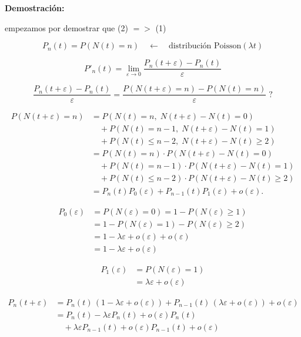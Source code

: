 \documentclass[12pt,a4paper]{article}
\begin{document}
\textbf{Demostración:}

empezamos por demostrar que (2) $= >$ (1)

\begin{equation*}
P_n(t) = P(N(t) = n) \quad \longleftarrow \quad \text{distribución Poisson}(\lambda t)
\end{equation*}

\begin{equation*}
P'_n(t) = \lim_{\varepsilon \to 0} \frac{P_n(t+\varepsilon) - P_n(t)}{\varepsilon}
\end{equation*}

\begin{equation*}
\frac{P_n(t+\varepsilon) - P_n(t)}{\varepsilon}
= \frac{P(N(t+\varepsilon)=n) - P(N(t)=n)}{\varepsilon}\; ?
\end{equation*}

\begin{align*}
P(N(t+\varepsilon) = n) 
&= P(N(t)=n,\; N(t+\varepsilon)-N(t)=0) \\
&\quad + P(N(t)=n-1,\; N(t+\varepsilon)-N(t)=1) \\
&\quad + P(N(t)\leq n-2,\; N(t+\varepsilon)-N(t)\geq 2) \\
&= P(N(t)=n)\cdot P(N(t+\varepsilon)-N(t)=0) \\
&\quad + P(N(t)=n-1)\cdot P(N(t+\varepsilon)-N(t)=1) \\
&\quad + P(N(t)\leq n-2)\cdot P(N(t+\varepsilon)-N(t)\geq 2) \\
&= P_n(t)P_0(\varepsilon) + P_{n-1}(t)P_1(\varepsilon) + o(\varepsilon).
\end{align*}


\begin{align*}
P_0(\varepsilon) &= P(N(\varepsilon)=0) 
= 1 - P(N(\varepsilon)\geq 1) \\
&= 1 - P(N(\varepsilon)=1) - P(N(\varepsilon)\geq 2) \\
&= 1 - \lambda \varepsilon + o(\varepsilon) + o(\varepsilon) \\
&= 1 - \lambda \varepsilon + o(\varepsilon)
\end{align*}

\begin{align*}
P_1(\varepsilon) &= P(N(\varepsilon)=1) \\
&= \lambda \varepsilon + o(\varepsilon)
\end{align*}

\begin{align*}
P_n(t+\varepsilon) 
&= P_n(t)\,(1 - \lambda \varepsilon + o(\varepsilon)) 
   + P_{n-1}(t)\,(\lambda \varepsilon + o(\varepsilon)) 
   + o(\varepsilon) \\
&= P_n(t) - \lambda \varepsilon P_n(t) + o(\varepsilon)P_n(t) \\
&\quad + \lambda \varepsilon P_{n-1}(t) + o(\varepsilon)P_{n-1}(t) 
   + o(\varepsilon)
\end{align*}
\end{document}
